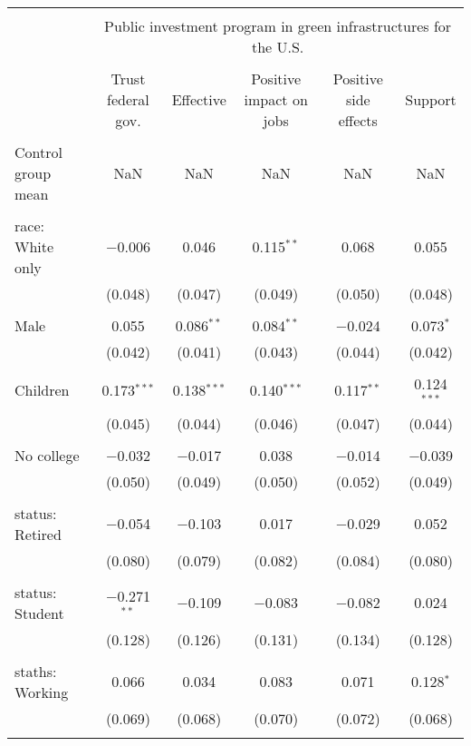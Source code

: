 
\begin{tabular}{@{\extracolsep{5pt}}lccccc} 
\\[-1.8ex]\hline 
\hline \\[-1.8ex] 
 & \multicolumn{5}{c}{Public investment program in green infrastructures for the U.S.} \\ 
\cline{2-6} 
\\[-1.8ex] & Trust federal gov. & Effective & Positive impact on jobs & Positive side effects & Support \\ 
\hline \\[-1.8ex] 
 Control group mean & NaN & NaN & NaN & NaN & NaN  \\ \hline \\[-1.8ex] race: White only & $-$0.006 & 0.046 & 0.115$^{**}$ & 0.068 & 0.055 \\ 
  & (0.048) & (0.047) & (0.049) & (0.050) & (0.048) \\ 
  & & & & & \\ 
 Male & 0.055 & 0.086$^{**}$ & 0.084$^{**}$ & $-$0.024 & 0.073$^{*}$ \\ 
  & (0.042) & (0.041) & (0.043) & (0.044) & (0.042) \\ 
  & & & & & \\ 
 Children & 0.173$^{***}$ & 0.138$^{***}$ & 0.140$^{***}$ & 0.117$^{**}$ & 0.124$^{***}$ \\ 
  & (0.045) & (0.044) & (0.046) & (0.047) & (0.044) \\ 
  & & & & & \\ 
 No college & $-$0.032 & $-$0.017 & 0.038 & $-$0.014 & $-$0.039 \\ 
  & (0.050) & (0.049) & (0.050) & (0.052) & (0.049) \\ 
  & & & & & \\ 
 status: Retired & $-$0.054 & $-$0.103 & 0.017 & $-$0.029 & 0.052 \\ 
  & (0.080) & (0.079) & (0.082) & (0.084) & (0.080) \\ 
  & & & & & \\ 
 status: Student & $-$0.271$^{**}$ & $-$0.109 & $-$0.083 & $-$0.082 & 0.024 \\ 
  & (0.128) & (0.126) & (0.131) & (0.134) & (0.128) \\ 
  & & & & & \\ 
 staths: Working & 0.066 & 0.034 & 0.083 & 0.071 & 0.128$^{*}$ \\ 
  & (0.069) & (0.068) & (0.070) & (0.072) & (0.068) \\ 
  & & & & & \\ 

\end{tabular}
